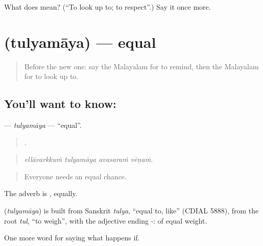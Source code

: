\begin{tcolorbox}[breakable,colback=teal!4,colframe=teal!35!black,title={Before you move on}]
What does  mean? (\textquotedblleft{}To look up to; to respect\textquotedblright{}.) Say it once more.
\end{tcolorbox}
\section[\texorpdfstring{\ml{തുല്യമായ} (tulyamāya)}{തുല്യമായ (tulyamāya)}]{ (tulyamāya) — equal}

\label{lesson:ML-C455-tulyamaya}



\begin{quote}
Before the new one: say the Malayalam for to remind, then the Malayalam for to look up to.
\end{quote}

\subsection*{You'll want to know: }
\textbf{} — \emph{tulyamāya} — \textquotedblleft{}equal\textquotedblright{}.

\begin{quote}
   .
\end{quote}

\begin{quote}
\emph{ellāvarkkuṁ tulyamāya avasaraṁ vēṇaṁ.}
\end{quote}

\begin{quote}
Everyone needs an equal chance.
\end{quote}

The adverb is , equally.

\begin{cousinweb}
\textbf{} (\emph{tulyamāya}) is built from Sanskrit \emph{tulya}, \textquotedblleft{}equal to, like\textquotedblright{} (CDIAL 5888), from the root \emph{tul}, \textquotedblleft{}to weigh\textquotedblright{}, with the adjective ending -: of equal weight.
\end{cousinweb}

\begin{grammarlens}[title={What you've built}]
One more word for saying what happens if.
\end{grammarlens}

